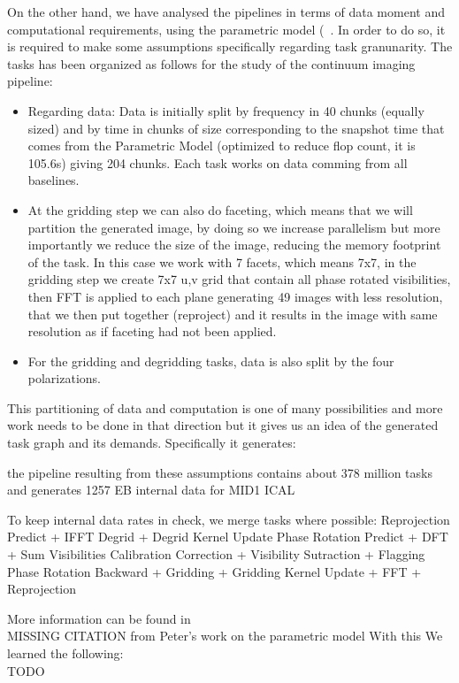 
On the other hand, we have analysed the pipelines in terms of data moment and computational requirements, using 
the parametric model (~\cite{ParametricModel}. In order to do so, it is required to make some assumptions specifically regarding
task granunarity. The tasks has been organized as follows for the study of the continuum imaging pipeline:
\begin{itemize}
\item Regarding data: Data is initially split by frequency in 40 chunks (equally sized) and by time in chunks of size corresponding to the snapshot time
that comes from the Parametric Model (optimized to reduce flop count, it is 105.6s) giving 204 chunks. Each task works on data comming from all baselines.
\item At the gridding step we can also do faceting, which means that we will partition the generated image, by doing so we increase parallelism but more
importantly we reduce the size of the image, reducing the memory footprint of the task. 
In this case we work with 7 facets, which means 7x7, in the gridding step we create 7x7 u,v grid that contain
all phase rotated visibilities, then FFT is applied to each plane generating 49 images with less resolution, that we then put together (reproject) and it
results in the image with same resolution as if faceting had not been applied. 
\item For the gridding and degridding tasks, data is also split by the four polarizations.
\end{itemize}
This partitioning of data and computation is one of many possibilities and more work needs to be done in that direction but it gives us an idea
of the generated task graph and its demands. Specifically it generates:

the pipeline resulting from these assumptions contains about 378 million tasks and generates 1257 EB internal data for MID1 ICAL 


To keep internal data rates in check, we merge tasks where possible:
Reprojection Predict + IFFT
Degrid + Degrid Kernel Update
Phase Rotation Predict + DFT + Sum Visibilities
Calibration Correction + Visibility Sutraction + Flagging
Phase Rotation Backward + Gridding + Gridding Kernel Update + FFT + Reprojection

More information can be found in \\ MISSING CITATION from Peter's work on the parametric model
With this We learned the following:  \\ TODO





